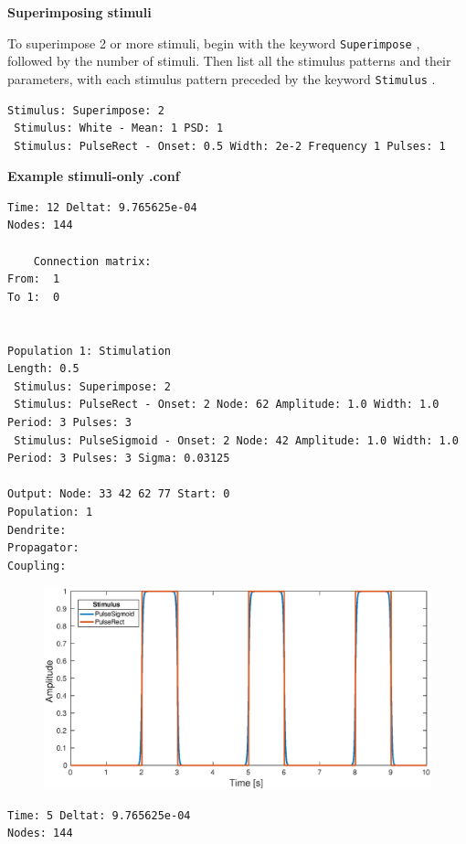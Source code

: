 \documentclass[12pt,a4paper]{article}
\newcommand{\type}[1]{{\small\small\tt #1} }
\begin{document}
\begin{description}
\begin{itemize}
    \vspace{5mm}
    \textbf{Superimposing stimuli}

    To superimpose 2 or more stimuli, begin with the keyword \type{Superimpose}, followed by the number of stimuli. Then list all the stimulus patterns and their parameters, with each stimulus pattern preceded by the keyword \type{Stimulus}.
    \begin{lstlisting}
Stimulus: Superimpose: 2
 Stimulus: White - Mean: 1 PSD: 1
 Stimulus: PulseRect - Onset: 0.5 Width: 2e-2 Frequency 1 Pulses: 1
    \end{lstlisting}

    \vspace{5mm}
    \textbf{Example stimuli-only .conf}

    \begin{lstlisting}
Time: 12 Deltat: 9.765625e-04
Nodes: 144

    Connection matrix:
From:  1 
To 1:  0


Population 1: Stimulation
Length: 0.5
 Stimulus: Superimpose: 2
 Stimulus: PulseRect - Onset: 2 Node: 62 Amplitude: 1.0 Width: 1.0 Period: 3 Pulses: 3
 Stimulus: PulseSigmoid - Onset: 2 Node: 42 Amplitude: 1.0 Width: 1.0 Period: 3 Pulses: 3 Sigma: 0.03125

Output: Node: 33 42 62 77 Start: 0
Population: 1
Dendrite:  
Propagator:
Coupling: 
    \end{lstlisting}
\begin{figure}[h]
\begin{center}
 \includegraphics[width=\textwidth]{img/compare_pulsesigmoid_pulserect.eps}
\end{center}
\end{figure}

    \begin{lstlisting}
Time: 5 Deltat: 9.765625e-04
Nodes: 144


\end{lstlisting}
\end{itemize}
\end{description}
\end{document}
